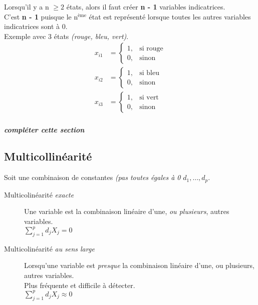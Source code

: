 \documentclass[10pt, french]{article}
\begin{document}
\begin{multicols*}{3}
Lorsqu'il y a n $\ge 2$ états, alors il faut créer \textbf{n - 1} variables indicatrices.\\
C'est \textbf{n - 1} puisque le n$^{\text{ème}}$ état est représenté lorsque toutes les autres variables indicatrices sont à 0.\\
Exemple avec 3 états \textit{(rouge, bleu, vert)}.
\begin{align*}
	x_{i1} &= \left\{
	\begin{matrix}
		1, & \text{si rouge} \\
		0, & \text{sinon}
	\end{matrix}
	\right.\\
	x_{i2} &= \left\{
	\begin{matrix}
		1, & \text{si bleu} \\
		0, & \text{sinon}
	\end{matrix}
	\right.\\
	x_{i3} &= \left\{
	\begin{matrix}
		1, & \text{si vert} \\
		0, & \text{sinon}
	\end{matrix}
	\right.\\ 
\end{align*}

\textit{\textbf{compléter cette section}}

\subsection*{Multicollinéarité}
Soit une combinaison de constantes \textit{(pas toutes égales à 0} $d_{1}, \dots, d_{p}$.
\begin{description}
	\item[Multicolinéarité \textit{exacte}] Une variable est la combinaison linéaire d'une, \textit{ou plusieurs}, autres variables.\\
	$\sum_{j = 1}^{p}d_{j}X_{j} = 0$
	\item[Multicolinéarité \textit{au sens large}] Lorsqu'une variable est \textit{presque} la combinaison linéaire d'une, ou plusieurs, autres variables.\\
	Plus fréquente et difficile à détecter. \\
	$\sum_{j = 1}^{p}d_{j}X_{j} \approx 0$
\end{description}


\end{multicols*}
\end{document}
